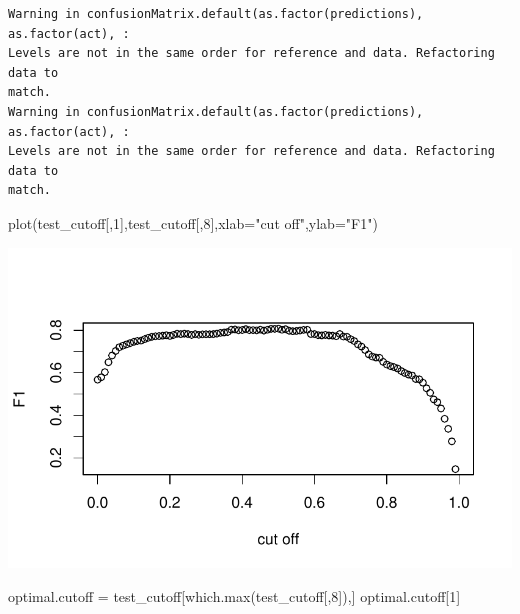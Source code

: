 \documentclass[
  letterpaper,
  DIV=11,
  numbers=noendperiod]{scrartcl}
\newenvironment{Shaded}{\begin{snugshade}}{\end{snugshade}}
\newcommand{\AttributeTok}[1]{\textcolor[rgb]{0.40,0.45,0.13}{#1}}
\newcommand{\CommentTok}[1]{\textcolor[rgb]{0.37,0.37,0.37}{#1}}
\newcommand{\DecValTok}[1]{\textcolor[rgb]{0.68,0.00,0.00}{#1}}
\newcommand{\FunctionTok}[1]{\textcolor[rgb]{0.28,0.35,0.67}{#1}}
\newcommand{\NormalTok}[1]{\textcolor[rgb]{0.00,0.23,0.31}{#1}}
\newcommand{\OtherTok}[1]{\textcolor[rgb]{0.00,0.23,0.31}{#1}}
\newcommand{\SpecialCharTok}[1]{\textcolor[rgb]{0.37,0.37,0.37}{#1}}
\newcommand{\StringTok}[1]{\textcolor[rgb]{0.13,0.47,0.30}{#1}}
\begin{document}
\begin{Shaded}
\end{Shaded}

\begin{verbatim}
Warning in confusionMatrix.default(as.factor(predictions), as.factor(act), :
Levels are not in the same order for reference and data. Refactoring data to
match.
Warning in confusionMatrix.default(as.factor(predictions), as.factor(act), :
Levels are not in the same order for reference and data. Refactoring data to
match.
\end{verbatim}

\begin{Shaded}
\begin{Highlighting}[]
\FunctionTok{plot}\NormalTok{(test\_cutoff[,}\DecValTok{1}\NormalTok{],test\_cutoff[,}\DecValTok{8}\NormalTok{],}\AttributeTok{xlab=}\StringTok{"cut off"}\NormalTok{,}\AttributeTok{ylab=}\StringTok{"F1"}\NormalTok{)}
\end{Highlighting}
\end{Shaded}

\includegraphics{FinalProject_files/figure-pdf/unnamed-chunk-26-1.pdf}

\begin{Shaded}
\begin{Highlighting}[]
\NormalTok{optimal.cutoff }\OtherTok{=}\NormalTok{ test\_cutoff[}\FunctionTok{which.max}\NormalTok{(test\_cutoff[,}\DecValTok{8}\NormalTok{]),]}
\NormalTok{optimal.cutoff[}\DecValTok{1}\NormalTok{]}
\end{Highlighting}
\end{Shaded}
\end{document}
